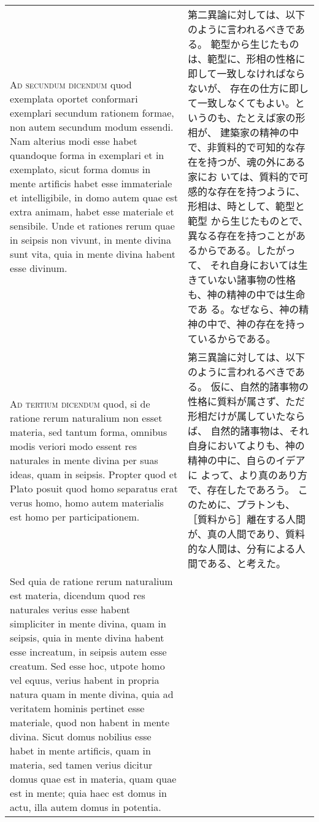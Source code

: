 \documentclass[10pt]{jsarticle} %
\begin{document}
\begin{longtable}{p{21em}p{21em}}
\\




{\scshape Ad secundum dicendum} quod exemplata oportet
 conformari exemplari secundum rationem formae, non autem secundum modum
 essendi. Nam alterius modi esse habet quandoque forma in exemplari et
 in exemplato, sicut forma domus in mente artificis habet esse
 immateriale et intelligibile, in domo autem quae est extra animam,
 habet esse materiale et sensibile. Unde et rationes rerum quae in
 seipsis non vivunt, in mente divina sunt vita, quia in mente divina
 habent esse divinum.


&

第二異論に対しては、以下のように言われるべきである。
範型から生じたものは、範型に、形相の性格に即して一致しなければならないが、
 存在の仕方に即して一致しなくてもよい。というのも、たとえば家の形相が、
 建築家の精神の中で、非質料的で可知的な存在を持つが、魂の外にある家にお
 いては、質料的で可感的な存在を持つように、形相は、時として、範型と範型
 から生じたものとで、異なる存在を持つことがあるからである。したがって、
 それ自身においては生きていない諸事物の性格も、神の精神の中では生命であ
 る。なぜなら、神の精神の中で、神の存在を持っているからである。


\\




{\scshape Ad tertium dicendum} quod, si de ratione rerum
 naturalium non esset materia, sed tantum forma, omnibus modis veriori
 modo essent res naturales in mente divina per suas ideas, quam in
 seipsis. Propter quod et Plato posuit quod homo separatus erat verus
 homo, homo autem materialis est homo per participationem. 
&


第三異論に対しては、以下のように言われるべきである。
仮に、自然的諸事物の性格に質料が属さず、ただ形相だけが属していたならば、
 自然的諸事物は、それ自身においてよりも、神の精神の中に、自らのイデアに
 よって、より真のあり方で、存在したであろう。
このために、プラトンも、［質料から］離在する人間が、真の人間であり、質料
 的な人間は、分有による人間である、と考えた。


\\


Sed quia de
 ratione rerum naturalium est materia, dicendum quod res naturales
 verius esse habent simpliciter in mente divina, quam in seipsis, quia
 in mente divina habent esse increatum, in seipsis autem esse
 creatum. Sed esse hoc, utpote homo vel equus, verius habent in propria
 natura quam in mente divina, quia ad veritatem hominis pertinet esse
 materiale, quod non habent in mente divina. Sicut domus nobilius esse
 habet in mente artificis, quam in materia, sed tamen verius dicitur
 domus quae est in materia, quam quae est in mente; quia haec est domus
 in actu, illa autem domus in potentia.




\end{longtable}
\end{document}

